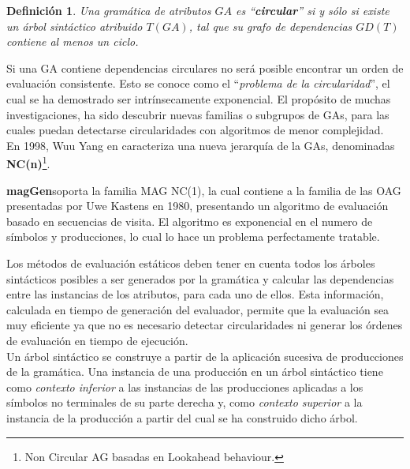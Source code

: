 \documentclass[a4paper]{article}
\newtheorem{definition}{Definición}[section]
\newcommand{\maggen}{\textbf{magGen}}
\begin{document}
\begin{definition}
Una gramática de atributos $GA$ es ``\textbf{circular}'' si y sólo si existe un árbol sintáctico atribuido $T(GA)$, tal que su grafo de dependencias $GD(T)$ contiene al menos un ciclo.
\end{definition}

Si una GA contiene dependencias circulares no será posible encontrar un orden de evaluación consistente. Esto se conoce como el ``\textit{problema de la circularidad}'', el cual se ha demostrado ser intrínsecamente exponencial\cite{intri-exc}. El propósito de muchas investigaciones, ha sido descubrir nuevas familias o subgrupos de GAs, para las cuales puedan detectarse circularidades con algoritmos de menor complejidad. \\

En 1998, Wuu Yang en \cite{wuu-yang2} caracteriza una nueva jerarquía de la GAs, denominadas \textbf{NC(n)}\footnote{Non Circular AG basadas en Lookahead behaviour.}.

\maggen soporta la familia MAG NC(1), la cual contiene a la familia de las OAG presentadas 
por Uwe Kastens\cite{kastens} en 1980, presentando un algoritmo de evaluación basado en secuencias de visita.
El algoritmo es exponencial en el numero de símbolos y producciones, lo cual lo hace un problema perfectamente tratable.


Los métodos de evaluación estáticos deben tener en cuenta todos los árboles sintácticos posibles a ser generados por la gramática y calcular las dependencias entre las instancias de los atributos, para cada uno de ellos. Esta información, calculada en tiempo de generación del
evaluador, permite que la evaluación sea muy eficiente ya que no es necesario detectar
circularidades ni generar los órdenes de evaluación en tiempo de ejecución. \\

Un árbol sintáctico se construye a partir de la aplicación sucesiva de producciones de la gramática. Una instancia de una producción en un árbol sintáctico tiene como \emph{contexto inferior} a las instancias de las producciones aplicadas a los símbolos no terminales de su parte derecha y, como \emph{contexto superior} a la instancia de la producción a partir del
cual se ha construido dicho árbol.
\end{document}

